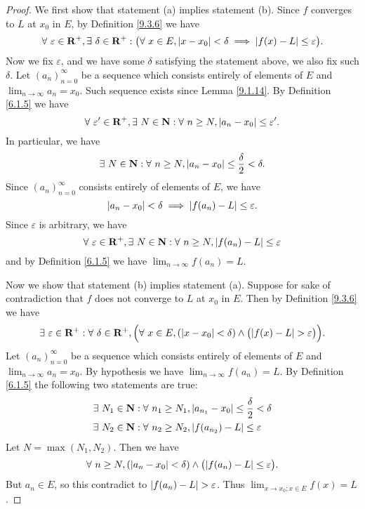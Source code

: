 \begin{proof}
    We first show that statement (a) implies statement (b).
    Since \(f\) converges to \(L\) at \(x_0\) in \(E\), by Definition \ref{9.3.6} we have
    \[
        \forall\ \varepsilon \in \mathbf{R}^+, \exists\ \delta \in \mathbf{R}^+ : \big(\forall\ x \in E, \abs*{x - x_0} < \delta \implies \abs*{f(x) - L} \leq \varepsilon\big).
    \]
    Now we fix \(\varepsilon\), and we have some \(\delta\) satisfying the statement above, we also fix such \(\delta\).
    Let \((a_n)_{n = 0}^\infty\) be a sequence which consists entirely of elements of \(E\) and \(\lim_{n \to \infty} a_n = x_0\).
    Such sequence exists since Lemma \ref{9.1.14}.
    By Definition \ref{6.1.5} we have
    \[
        \forall\ \varepsilon' \in \mathbf{R}^+, \exists\ N \in \mathbf{N} : \forall\ n \geq N, \abs*{a_n - x_0} \leq \varepsilon'.
    \]
    In particular, we have
    \[
        \exists\ N \in \mathbf{N} : \forall\ n \geq N, \abs*{a_n - x_0} \leq \frac{\delta}{2} < \delta.
    \]
    Since \((a_n)_{n = 0}^\infty\) consists entirely of elements of \(E\), we have
    \[
        \abs*{a_n - x_0} < \delta \implies \abs*{f(a_n) - L} \leq \varepsilon.
    \]
    Since \(\varepsilon\) is arbitrary, we have
    \[
        \forall\ \varepsilon \in \mathbf{R}^+, \exists\ N \in \mathbf{N} : \forall\ n \geq N, \abs*{f(a_n) - L} \leq \varepsilon
    \]
    and by Definition \ref{6.1.5} we have \(\lim_{n \to \infty} f(a_n) = L\).

    Now we show that statement (b) implies statement (a).
    Suppose for sake of contradiction that \(f\) does not converge to \(L\) at \(x_0\) in \(E\).
    Then by Definition \ref{9.3.6} we have
    \[
        \exists\ \varepsilon \in \mathbf{R}^+ : \forall\ \delta \in \mathbf{R}^+, \Big(\forall\ x \in E, (\abs*{x - x_0} < \delta) \land \big(\abs*{f(x) - L} > \varepsilon\big)\Big).
    \]
    Let \((a_n)_{n = 0}^\infty\) be a sequence which consists entirely of elements of \(E\) and \(\lim_{n \to \infty} a_n = x_0\).
    By hypothesis we have \(\lim_{n \to \infty} f(a_n) = L\).
    By Definition \ref{6.1.5} the following two statements are true:
    \begin{align*}
         & \exists\ N_1 \in \mathbf{N} : \forall\ n_1 \geq N_1, \abs*{a_{n_1} - x_0} \leq \frac{\delta}{2} < \delta \\
         & \exists\ N_2 \in \mathbf{N} : \forall\ n_2 \geq N_2, \abs*{f(a_{n_2}) - L} \leq \varepsilon
    \end{align*}
    Let \(N = \max(N_1, N_2)\).
    Then we have
    \[
        \forall\ n \geq N, (\abs*{a_n - x_0} < \delta) \land \big(\abs*{f(a_n) - L} \leq \varepsilon\big).
    \]
    But \(a_n \in E\), so this contradict to \(\abs*{f(a_n) - L} > \varepsilon\).
    Thus \(\lim_{x \to x_0 ; x \in E} f(x) = L\).
\end{proof}

